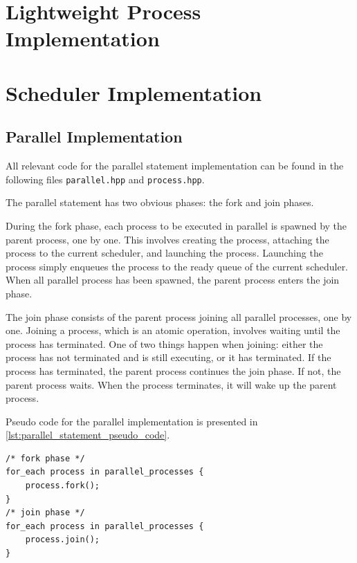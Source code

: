\section{Lightweight Process Implementation}


\section{Scheduler Implementation}

\FloatBarrier
\subsection{Parallel Implementation}
\label{subsec:parallel_implementation}

All relevant code for the parallel statement implementation can be found in the following files \texttt{parallel.hpp} and \texttt{process.hpp}.

The parallel statement has two obvious phases: the fork and join phases. 

During the fork phase, each process to be executed in parallel is spawned by the parent process, one by one. This involves creating the process, attaching the process to the current scheduler, and launching the process. Launching the process simply enqueues the process to the ready queue of the current scheduler. When all parallel process has been spawned, the parent process enters the join phase.

The join phase consists of the parent process joining all parallel processes, one by one. Joining a process, which is an atomic operation, involves waiting until the process has terminated. One of two things happen when joining: either the process has not terminated and is still executing, or it has terminated. If the process has terminated, the parent process continues the join phase. If not, the parent process waits. When the process terminates, it will wake up the parent process.

Pseudo code for the parallel implementation is presented in \cref{lst:parallel_statement_pseudo_code}.

\begin{lstfloat}
\begin{lstlisting}[caption={Parallel statement pseudo code.}, label={lst:parallel_statement_pseudo_code}, style={CustomC++}, xleftmargin={4em}]
/* fork phase */
for_each process in parallel_processes {
    process.fork();
}
/* join phase */
for_each process in parallel_processes {
    process.join();
}
\end{lstlisting}
\end{lstfloat}

